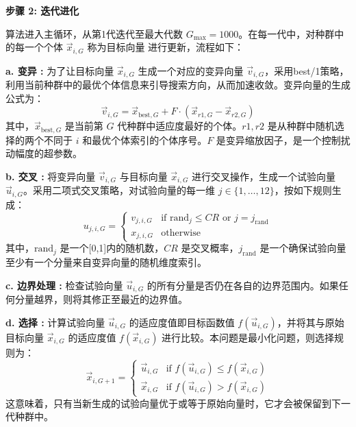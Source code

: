 \documentclass[5pt, withoutpreface,bwprint]{cumcmthesis} %
\begin{document}
    \textbf{步骤 2: 迭代进化}
    
    算法进入主循环，从第1代迭代至最大代数 $G_{\max}=1000$。在每一代中，对种群中的每一个个体 $\vec{x}_{i,G}$ 称为目标向量 进行更新，流程如下：
    
    \textbf{a. 变异 :}
        为了让目标向量 $\vec{x}_{i,G}$ 生成一个对应的变异向量 $\vec{v}_{i,G}$，采用best/1策略，利用当前种群中的最优个体信息来引导搜索方向，从而加速收敛。变异向量的生成公式为：
        \begin{equation} \vec{v}_{i,G} = \vec{x}_{\text{best},G} + F \cdot (\vec{x}_{r1,G} - \vec{x}_{r2,G}) \end{equation}
        其中，$\vec{x}_{\text{best},G}$ 是当前第 $G$ 代种群中适应度最好的个体。$r1, r2$ 是从种群中随机选择的两个不同于 $i$ 和最优个体索引的个体序号。$F$ 是变异缩放因子，是一个控制扰动幅度的超参数。
        
        \textbf{b. 交叉 :}
        将变异向量 $\vec{v}_{i,G}$ 与目标向量 $\vec{x}_{i,G}$ 进行交叉操作，生成一个试验向量 $\vec{u}_{i,G}$。采用二项式交叉策略，对试验向量的每一维 $j \in \{1, \dots, 12\}$，按如下规则生成：
        \begin{equation} u_{j, i, G} = 
        \begin{cases} 
        v_{j, i, G} & \text{if } \text{rand}_j \le CR \text{ or } j = j_{\text{rand}} \\
        x_{j, i, G} & \text{otherwise}
        \end{cases}
        \end{equation}
        其中，$\text{rand}_j$ 是一个[0,1]内的随机数，$CR$ 是交叉概率，$j_{\text{rand}}$ 是一个确保试验向量至少有一个分量来自变异向量的随机维度索引。
        
        \textbf{c. 边界处理 :}
        检查试验向量 $\vec{u}_{i,G}$ 的所有分量是否仍在各自的边界范围内。如果任何分量越界，则将其修正至最近的边界值。
        
        \textbf{d. 选择 :}
        计算试验向量 $\vec{u}_{i,G}$ 的适应度值即目标函数值 $f(\vec{u}_{i,G})$，并将其与原始目标向量 $\vec{x}_{i,G}$ 的适应度值 $f(\vec{x}_{i,G})$ 进行比较。本问题是最小化问题，则选择规则为：
        \begin{equation} \vec{x}_{i,G+1} = 
        \begin{cases} 
        \vec{u}_{i,G} & \text{if } f(\vec{u}_{i,G}) \le f(\vec{x}_{i,G}) \\
        \vec{x}_{i,G} & \text{if } f(\vec{u}_{i,G}) > f(\vec{x}_{i,G})
        \end{cases}
        \end{equation}
        这意味着，只有当新生成的试验向量优于或等于原始向量时，它才会被保留到下一代种群中。
    
\end{document}
